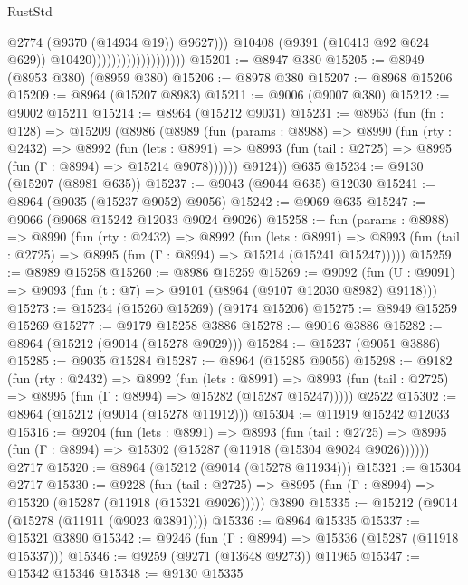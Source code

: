 \begin{lexlean}{RustStd}
\begin{coremodule}
                                                @2774
                                                (@9370 (@14934 @19))
                                                @9627)))
                                          @10408
                                          (@9391 (@10413 @92 @624 @629))
                                          @10420)))))))))))))))))))
@15201 := @8947 @380
@15205 := @8949 (@8953 @380) (@8959 @380)
@15206 := @8978 @380
@15207 := @8968 @15206
@15209 := @8964 (@15207 @8983)
@15211 := @9006 (@9007 @380)
@15212 := @9002 @15211
@15214 := @8964 (@15212 @9031)
@15231 := @8963
    (fun (fn : @128) =>
    @15209
      (@8986
        (@8989
          (fun (params : @8988) =>
          @8990
            (fun (rty : @2432) =>
            @8992
              (fun (lets : @8991) =>
              @8993 (fun (tail : @2725) => @8995 (fun (Γ : @8994) => @15214 @9078))))))
        @9124))
    @635
@15234 := @9130 (@15207 (@8981 @635))
@15237 := @9043 (@9044 @635) @12030
@15241 := @8964 (@9035 (@15237 @9052) @9056)
@15242 := @9069 @635
@15247 := @9066 (@9068 @15242 @12033 @9024 @9026)
@15258 := fun (params : @8988) =>
  @8990
    (fun (rty : @2432) =>
    @8992
      (fun (lets : @8991) =>
      @8993 (fun (tail : @2725) => @8995 (fun (Γ : @8994) => @15214 (@15241 @15247)))))
@15259 := @8989 @15258
@15260 := @8986 @15259
@15269 := @9092
    (fun (U : @9091) => @9093 (fun (t : @7) => @9101 (@8964 (@9107 @12030 @8982) @9118)))
@15273 := @15234 (@15260 @15269) (@9174 @15206)
@15275 := @8949 @15259 @15269
@15277 := @9179 @15258 @3886
@15278 := @9016 @3886
@15282 := @8964 (@15212 (@9014 (@15278 @9029)))
@15284 := @15237 (@9051 @3886)
@15285 := @9035 @15284
@15287 := @8964 (@15285 @9056)
@15298 := @9182
    (fun (rty : @2432) =>
    @8992
      (fun (lets : @8991) =>
      @8993 (fun (tail : @2725) => @8995 (fun (Γ : @8994) => @15282 (@15287 @15247)))))
    @2522
@15302 := @8964 (@15212 (@9014 (@15278 @11912)))
@15304 := @11919 @15242 @12033
@15316 := @9204
    (fun (lets : @8991) =>
    @8993
      (fun (tail : @2725) =>
      @8995 (fun (Γ : @8994) => @15302 (@15287 (@11918 (@15304 @9024 @9026))))))
    @2717
@15320 := @8964 (@15212 (@9014 (@15278 @11934)))
@15321 := @15304 @2717
@15330 := @9228
    (fun (tail : @2725) => @8995 (fun (Γ : @8994) => @15320 (@15287 (@11918 (@15321 @9026)))))
    @3890
@15335 := @15212 (@9014 (@15278 (@11911 (@9023 @3891))))
@15336 := @8964 @15335
@15337 := @15321 @3890
@15342 := @9246 (fun (Γ : @8994) => @15336 (@15287 (@11918 @15337)))
@15346 := @9259 (@9271 (@13648 @9273)) @11965
@15347 := @15342 @15346
@15348 := @9130 @15335

\end{coremodule}
\end{lexlean}
